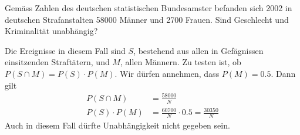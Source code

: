 Gemäss Zahlen des deutschen statistischen Bundesamster
befanden sich 2002 in deutschen Strafanstalten 58000 Männer
und 2700 Frauen. Sind Geschlecht und Kriminalität unabhängig?

\begin{loesung}
Die Ereignisse in diesem Fall sind $S$, bestehend aus allen in Gefägnissen
einsitzenden Straftätern, und $M$, allen Männern. Zu testen ist, ob
$P(S\cap M)=P(S)\cdot P(M)$. Wir dürfen annehmen, dass $P(M)=0.5$.
Dann gilt
\begin{align*}
P(S\cap M)&=\frac{58000}{N}\\
P(S)\cdot P(M)&=\frac{60700}{N}\cdot 0.5 = \frac{30350}{N}
\end{align*}
Auch in diesem Fall dürfte Unabhängigkeit nicht gegeben sein.
\end{loesung}

